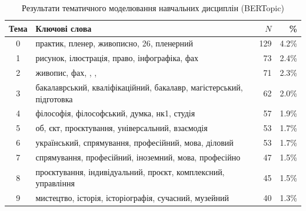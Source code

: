 \begin{table}[htbp]
\centering
\caption{Результати тематичного моделювання навчальних дисциплін (BERTopic)}\label{tab:topic-modeling}
\small
\begin{tabularx}{\textwidth}{@{}cXrr@{}}
\toprule
\textbf{Тема} & \textbf{Ключові слова} & \textbf{$N$} & \textbf{\%} \\
\midrule
    0 & практик, пленер, живописно, 26, пленерний & 129 & 4.2\% \\
    1 & рисунок, ілюстрація, право, інфографіка, фах & 73 & 2.4\% \\
    2 & живопис, фах, , ,  & 71 & 2.3\% \\
    3 & бакалаврський, кваліфікаційний, бакалавр, магістерський, підготовка & 62 & 2.0\% \\
    4 & філософія, філософський, думка, нк1, студія & 57 & 1.9\% \\
    5 & об, єкт, проєктування, універсальний, взаємодія & 53 & 1.7\% \\
    6 & український, спрямування, професійний, мова, діловий & 53 & 1.7\% \\
    7 & спрямування, професійний, іноземний, мова, професійно & 47 & 1.5\% \\
    8 & проєктування, індивідуальний, проєкт, комплексний, управління & 45 & 1.5\% \\
    9 & мистецтво, історія, історіографія, сучасний, музейний & 40 & 1.3\% \\
\bottomrule
\end{tabularx}
\end{table}